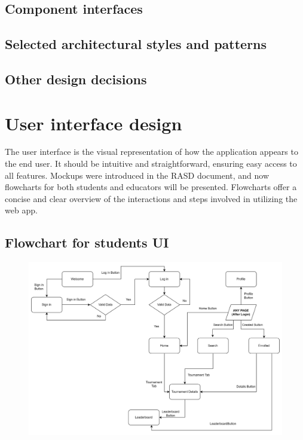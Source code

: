 \documentclass[12pt, a4paper]{report}
\begin{document}
    \section{Component interfaces}
    \section{Selected architectural styles and patterns}
    \section{Other design decisions}

\newpage 

\chapter{User interface design}
    The user interface is the visual representation of how the application appears to the end user.
    It should be intuitive and straightforward, ensuring easy access to all features.
    Mockups were introduced in the RASD document, and now flowcharts for both students and educators will be presented.
    Flowcharts offer a concise and clear overview of the interactions and steps involved in utilizing the web app.
    \section{Flowchart for students UI}
    \begin{figure}[H]
        \centering\includegraphics[width=0.9\linewidth]{images/students_UI.png}
    \end{figure}
\end{document}
